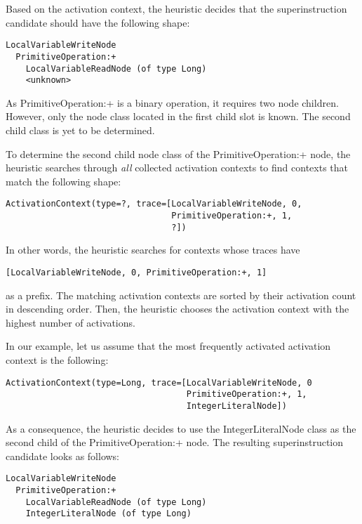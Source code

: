 \documentclass[10pt,a4paper]{article}
\begin{document}
Based on the activation context, the heuristic decides that the superinstruction candidate should have the following shape:

\begin{verbatim}
LocalVariableWriteNode
  PrimitiveOperation:+
    LocalVariableReadNode (of type Long)
    <unknown>
\end{verbatim}

As \textsf{PrimitiveOperation:+} is a binary operation, it requires two node children. However, only the node class located in the first child slot is known. The second child class is yet to be determined.

To determine the second child node class of the \textsf{PrimitiveOperation:+} node, the heuristic searches through \emph{all} collected activation contexts to find contexts that match the following shape:

\begin{verbatim}
ActivationContext(type=?, trace=[LocalVariableWriteNode, 0,
                                 PrimitiveOperation:+, 1,
                                 ?])
\end{verbatim}

In other words, the heuristic searches for contexts whose traces have
\begin{verbatim}
[LocalVariableWriteNode, 0, PrimitiveOperation:+, 1]
\end{verbatim}
as a prefix. The matching activation contexts are sorted by their activation count in descending order. Then, the heuristic chooses the activation context with the highest number of activations.

In our example, let us assume that the most frequently activated activation context is the following:

\begin{verbatim}
ActivationContext(type=Long, trace=[LocalVariableWriteNode, 0
                                    PrimitiveOperation:+, 1,
                                    IntegerLiteralNode])
\end{verbatim}

As a consequence, the heuristic decides to use the \textsf{IntegerLiteralNode} class as the second child of the \textsf{PrimitiveOperation:+} node. The resulting superinstruction candidate looks as follows:

\begin{verbatim}
LocalVariableWriteNode
  PrimitiveOperation:+
    LocalVariableReadNode (of type Long)
    IntegerLiteralNode (of type Long)
\end{verbatim}
\end{document}
